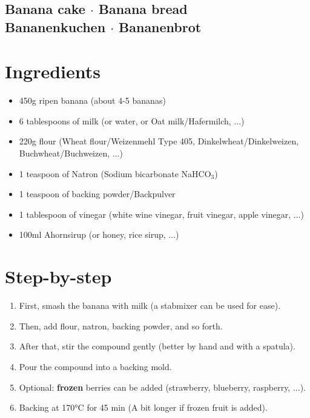 \documentclass[12pt]{article}
\begin{document}
\begin{center}
	\section*{Banana cake $\cdot$ Banana bread \\ Bananenkuchen $\cdot$ Bananenbrot}
\end{center}

\section*{Ingredients}
\begin{itemize}
	\item 450g ripen banana (about 4-5 bananas)
	\item 6 tablespoons of milk (or water, or Oat milk/Hafermilch, $\dots$)
	\item 220g flour (Wheat flour/Weizenmehl Type 405, Dinkelwheat/Dinkelweizen, Buchwheat/Buchweizen, $\dots$)
	\item 1 teaspoon of Natron (Sodium bicarbonate NaHCO$_{3}$)
	\item 1 teaspoon of backing powder/Backpulver
	\item 1 tablespoon of vinegar (white wine vinegar, fruit vinegar, apple vinegar, $\dots$)
	\item 100ml Ahornsirup (or honey, rice sirup, $\dots$)
\end{itemize}
\section*{Step-by-step}
\begin{enumerate}
	\item First, smash the banana with milk (a stabmixer can be used for ease).
	\item Then, add flour, natron, backing powder, and so forth.
	\item After that, stir the compound gently (better by hand and with a spatula).
	\item Pour the compound into a backing mold.
	\item Optional: \textbf{frozen} berries can be added (strawberry, blueberry, raspberry, $\dots$).
	\item Backing at 170°C for 45 min (A bit longer if frozen fruit is added).
\end{enumerate}


\end{document}
